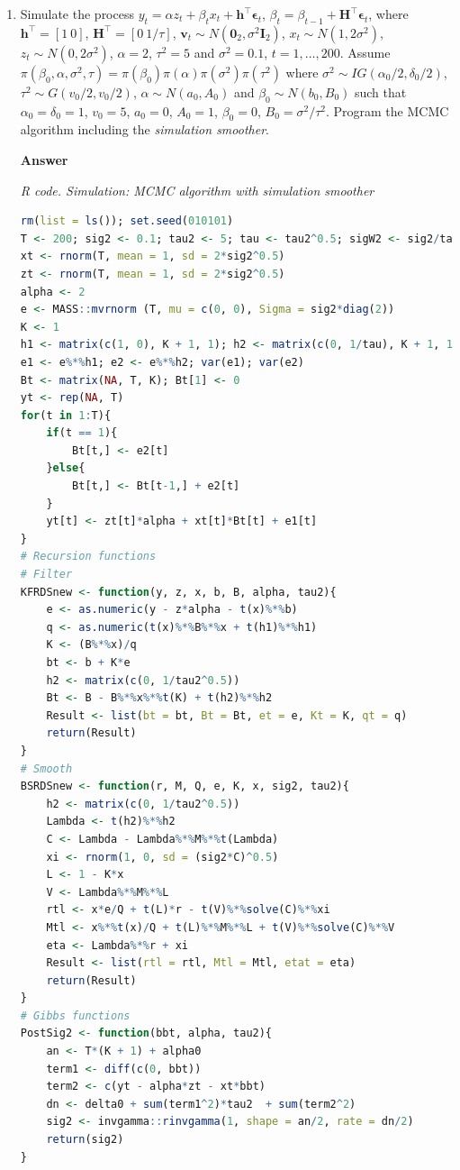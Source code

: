 \begin{enumerate}[leftmargin=*]
	\item Simulate the process $y_t=\alpha z_t + \beta_t x_t + \bm{h}^{\top}\bm{\epsilon}_t$, $\beta_t=\beta_{t-1}+\bm{H}^{\top}\bm{\epsilon}_t$, where $\bm{h}^{\top}=[1 \ 0]$, $\bm{H}^{\top}=[0 \ 1/\tau]$, $\bm{v}_t\sim N(\bm{0}_2, \sigma^2\bm{I}_2)$, $x_t\sim N(1, 2\sigma^2)$, $z_t\sim N(0, 2\sigma^2)$, $\alpha=2$, $\tau^2=5$ and $\sigma^2=0.1$, $t=1,\dots,200$. Assume $\pi({\beta}_0,{\alpha},\sigma^2,{\tau})=\pi({\beta}_0)\pi({\alpha})\pi(\sigma^2)\pi(\tau^2)$ where $\sigma^2\sim IG(\alpha_0/2,\delta_0/2)$, $\tau^2\sim G(v_{0}/2,v_{0}/2)$, ${\alpha}\sim N({a}_0,{A}_0)$ and ${\beta}_0\sim N({b}_0,{B}_0)$ such that $\alpha_0=\delta_0=1$, $v_0=5$, $a_0=0$, $A_0=1$, $\beta_0=0$, $B_0=\sigma^2/\tau^2$. Program the MCMC algorithm including the \textit{simulation smoother}.
	
	\textbf{Answer}
	

\begin{tcolorbox}[enhanced,width=4.67in,center upper,
	fontupper=\large\bfseries,drop shadow southwest,sharp corners]
	\textit{R code. Simulation: MCMC algorithm with simulation smoother}
	\begin{VF}
		\begin{lstlisting}[language=R]
rm(list = ls()); set.seed(010101)
T <- 200; sig2 <- 0.1; tau2 <- 5; tau <- tau2^0.5; sigW2 <- sig2/tau2
xt <- rnorm(T, mean = 1, sd = 2*sig2^0.5)
zt <- rnorm(T, mean = 1, sd = 2*sig2^0.5)
alpha <- 2
e <- MASS::mvrnorm (T, mu = c(0, 0), Sigma = sig2*diag(2))
K <- 1
h1 <- matrix(c(1, 0), K + 1, 1); h2 <- matrix(c(0, 1/tau), K + 1, 1); t(h1)%*%h2
e1 <- e%*%h1; e2 <- e%*%h2; var(e1); var(e2)
Bt <- matrix(NA, T, K); Bt[1] <- 0
yt <- rep(NA, T) 
for(t in 1:T){
	if(t == 1){
		Bt[t,] <- e2[t]
	}else{
		Bt[t,] <- Bt[t-1,] + e2[t] 
	}
	yt[t] <- zt[t]*alpha + xt[t]*Bt[t] + e1[t]
}
# Recursion functions
# Filter
KFRDSnew <- function(y, z, x, b, B, alpha, tau2){
	e <- as.numeric(y - z*alpha - t(x)%*%b)
	q <- as.numeric(t(x)%*%B%*%x + t(h1)%*%h1)
	K <- (B%*%x)/q
	bt <- b + K*e
	h2 <- matrix(c(0, 1/tau2^0.5))
	Bt <- B - B%*%x%*%t(K) + t(h2)%*%h2
	Result <- list(bt = bt, Bt = Bt, et = e, Kt = K, qt = q) 
	return(Result)
}
# Smooth
BSRDSnew <- function(r, M, Q, e, K, x, sig2, tau2){
	h2 <- matrix(c(0, 1/tau2^0.5))
	Lambda <- t(h2)%*%h2 
	C <- Lambda - Lambda%*%M%*%t(Lambda)
	xi <- rnorm(1, 0, sd = (sig2*C)^0.5)
	L <- 1 - K*x
	V <- Lambda%*%M%*%L
	rtl <- x*e/Q + t(L)*r - t(V)%*%solve(C)%*%xi
	Mtl <- x%*%t(x)/Q + t(L)%*%M%*%L + t(V)%*%solve(C)%*%V
	eta <- Lambda%*%r + xi
	Result <- list(rtl = rtl, Mtl = Mtl, etat = eta)
	return(Result)
}
# Gibbs functions
PostSig2 <- function(bbt, alpha, tau2){
	an <- T*(K + 1) + alpha0
	term1 <- diff(c(0, bbt))
	term2 <- c(yt - alpha*zt - xt*bbt)
	dn <- delta0 + sum(term1^2)*tau2  + sum(term2^2)
	sig2 <- invgamma::rinvgamma(1, shape = an/2, rate = dn/2)
	return(sig2)
}
\end{lstlisting}
	\end{VF}
\end{tcolorbox} 


\end{enumerate}
